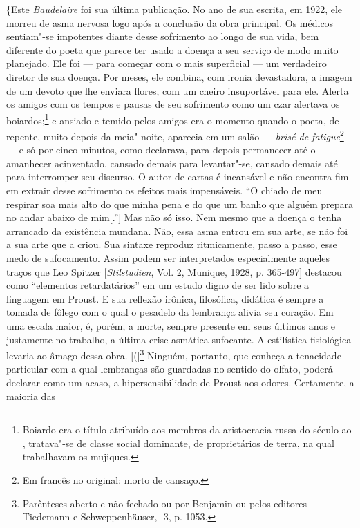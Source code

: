 \{Este \emph{Baudelaire} foi sua última publicação. No ano de sua
escrita, em 1922, ele morreu de asma nervosa logo após a conclusão da
obra principal. Os médicos sentiam"-se impotentes diante desse
sofrimento ao longo de sua vida, bem diferente do poeta que parece ter
usado a doença a seu serviço de modo muito planejado. Ele foi --- para
começar com o mais superficial --- um verdadeiro diretor de sua doença.
Por meses, ele combina, com ironia devastadora, a imagem de um devoto que
lhe enviara flores, com um cheiro insuportável para ele. Alerta os
amigos com os tempos e pausas de seu sofrimento como um czar alertava os
boiardos;\footnote{Boiardo era o título atribuído aos membros da
  aristocracia russa do século  ao , tratava"-se de classe social
  dominante, de proprietários de terra, na qual trabalhavam os mujiques. \versal{[N. E.]}}
e ansiado e temido pelos amigos era o momento quando o poeta, de
repente, muito depois da meia"-noite, aparecia em um salão --- \emph{brisé
de fatigue}\footnote{Em francês no original: morto de cansaço. \versal{[N. T.]}}
--- e só por cinco minutos, como declarava, para depois permanecer até o
amanhecer acinzentado, cansado demais para levantar"-se, cansado demais
até para interromper seu discurso. O autor de cartas é incansável e não
encontra fim em extrair desse sofrimento os efeitos mais impensáveis. ``O
chiado de meu respirar soa mais alto do que minha pena e do que um banho
que alguém prepara no andar abaixo de mim{[}.''{]} Mas não só isso. Nem
mesmo que a doença o tenha arrancado da existência mundana. Não, essa
asma entrou em sua arte, se não foi a sua arte que a criou. Sua sintaxe
reproduz ritmicamente, passo a passo, esse medo de sufocamento. Assim
podem ser interpretados especialmente aqueles traços que Leo Spitzer
{[}\emph{Stilstudien}, Vol. 2, Munique, 1928, p. 365-497{]} destacou como
``elementos retardatários'' em um estudo digno de ser lido sobre a
linguagem em Proust. E sua reflexão irônica, filosófica, didática é
sempre a tomada de fôlego com o qual o pesadelo da lembrança alivia seu
coração. Em uma escala maior, é, porém, a morte, sempre presente em seus
últimos anos e justamente no trabalho, a última crise asmática
sufocante. A estilística fisiológica levaria ao âmago dessa obra. {[}({]}\footnote{Parênteses aberto e não fechado ou por Benjamin ou pelos
  editores Tiedemann e Schweppenhäuser, -3, p. 1053. \versal{[N. T.]}}
Ninguém, portanto, que conheça a tenacidade particular com a qual lembranças são
guardadas no sentido do olfato, poderá declarar como um acaso, a
hipersensibilidade de Proust aos odores. Certamente, a maioria das
